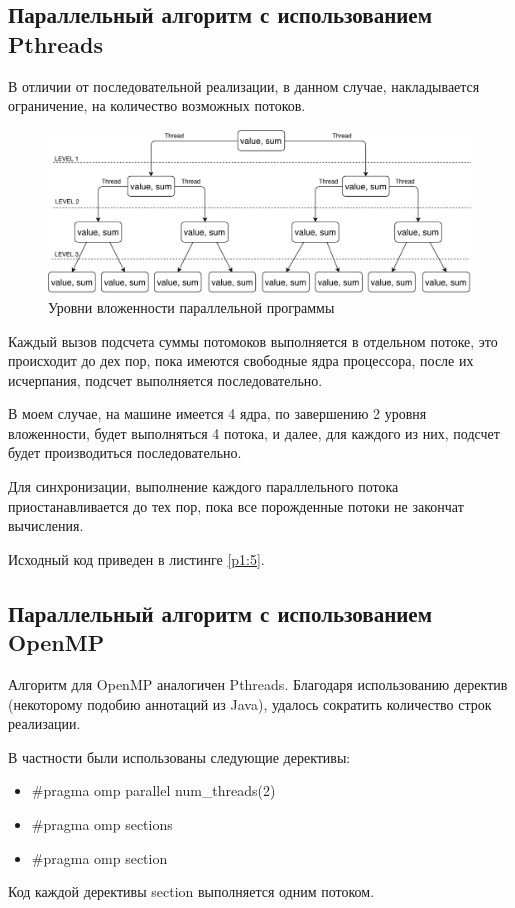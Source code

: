 \subsection{Параллельный алгоритм с использованием Pthreads}
В отличии от последовательной реализации, в данном случае, накладывается ограничение, на количество возможных потоков.
\begin{figure}[H]
  \centering
	\includegraphics[width=\textwidth]{img/parallel}
	\caption{Уровни вложенности параллельной программы}
\end{figure}
Каждый вызов подсчета суммы потомоков выполняется в отдельном потоке, это происходит до дех пор, пока имеются свободные ядра процессора, после их исчерпания, подсчет выполняется последовательно.

В моем случае, на машине имеется 4 ядра, по завершению 2 уровня вложенности, будет выполняться 4 потока, и далее, для каждого из них, подсчет будет производиться последовательно.

Для синхронизации, выполнение каждого параллельного потока приостанавливается до тех пор, пока все порожденные потоки не закончат вычисления.

Исходный код приведен в листинге \ref{p1:5}.
\subsection{Параллельный алгоритм с использованием OpenMP}
Алгоритм для OpenMP аналогичен Pthreads. Благодаря использованию деректив (некоторому подобию аннотаций из Java), удалось сократить количество строк реализации.

В частности были использованы следующие дерективы:
\begin{itemize}
\item \#pragma omp parallel num\_threads(2)
\item \#pragma omp sections
\item \#pragma omp section 
\end{itemize}
Код каждой дерективы section выполняется одним потоком.

